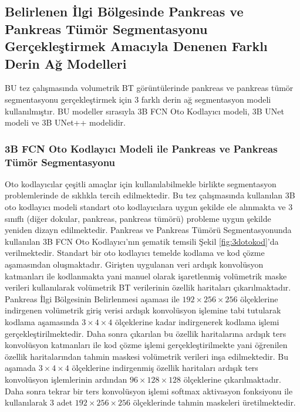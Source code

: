 \subsection{Belirlenen İlgi Bölgesinde Pankreas ve Pankreas Tümör Segmentasyonu Gerçekleştirmek Amacıyla Denenen Farklı Derin Ağ Modelleri}

BU tez çalışmasında volumetrik BT görüntülerinde pankreas ve pankreas tümör segmentasyonu gerçekleştirmek için 3 farklı derin ağ segmentasyon modeli kullanılmıştır. BU modeller sırasıyla 3B FCN Oto Kodlayıcı modeli, 3B UNet modeli ve 3B UNet++ modelidir. 

\subsubsection{3B FCN Oto Kodlayıcı Modeli ile Pankreas ve Pankreas Tümör Segmentasyonu}
Oto kodlayıcılar çeşitli amaçlar için kullanılabilmekle birlikte segmentasyon problemlerinde de sıklıkla tercih edilmektedir. Bu tez çalışmasında kullanılan 3B oto kodlayıcı modeli standart oto kodlayıcılara uygun şekilde ele alınmakta ve 3 sınıflı (diğer dokular, pankreas, pankreas tümörü) probleme uygun şekilde yeniden dizayn edilmektedir. Pankreas ve Pankreas Tümörü Segmentasyonunda kullanılan 3B FCN Oto Kodlayıcı'nın şematik temsili Şekil \ref{fig:3dotokod}'da verilmektedir. Standart bir oto kodlayıcı temelde kodlama ve kod çözme aşamasından oluşmaktadır. Girişten uygulanan veri ardışık konvolüsyon katmanları ile kodlanmakta yani manuel olarak işaretlenmiş volümetrik maske verileri kullanılarak volümetrik BT verilerinin özellik haritaları çıkarılmaktadır. Pankreas İlgi Bölgesinin Belirlenmesi aşaması ile $192 \times 256 \times 256$ ölçeklerine indirgenen volümetrik giriş verisi ardışık konvolüsyon işlemine tabi tutularak kodlama aşamasında $3 \times 4 \times 4$ ölçeklerine kadar indirgenerek kodlama işlemi gerçekleştirilmektedir. Daha sonra çıkarılan bu özellik haritalarına ardışık ters konvolüsyon katmanları ile kod çözme işlemi gerçekleştirilmekte yani öğrenilen özellik haritalarından tahmin maskesi volümetrik verileri inşa edilmektedir. Bu aşamada $3 \times 4 \times 4$ ölçeklerine indirgenmiş özellik haritaları ardışık ters konvolüsyon işlemlerinin ardından $96 \times 128 \times 128$ ölçeklerine çıkarılmaktadır. Daha sonra tekrar bir ters konvolüsyon işlemi softmax aktivasyon fonksiyonu ile kullanılarak 3 adet $192 \times 256 \times 256$ ölçeklerinde tahmin maskeleri üretilmektedir.  

